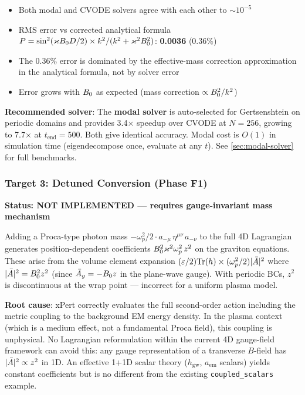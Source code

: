 \begin{itemize}
  \item Both modal and CVODE solvers agree with each other to $\sim 10^{-5}$
  \item RMS error vs corrected analytical formula $P = \sin^2(\varkappa B_0 D/2) \times k^2/(k^2 + \varkappa^2B_0^2)$: \textbf{0.0036} (0.36\%)
  \item The 0.36\% error is dominated by the effective-mass correction approximation in the analytical formula, not by solver error
  \item Error grows with $B_0$ as expected (mass correction $\propto B_0^2/k^2$)
\end{itemize}

\textbf{Recommended solver}: The \textbf{modal solver} is auto-selected for Gertsenshtein on periodic domains and provides 3.4$\times$ speedup over CVODE at $N = 256$, growing to 7.7$\times$ at $t_\mathrm{end} = 500$. Both give identical accuracy. Modal cost is $O(1)$ in simulation time (eigendecompose once, evaluate at any $t$). See \cref{sec:modal-solver} for full benchmarks.

\subsubsection{Target 3: Detuned Conversion (Phase F1)}
\label{subsec:target3}

\textbf{Status: NOT IMPLEMENTED --- requires gauge-invariant mass mechanism}

Adding a Proca-type photon mass $-\omega_p^2/2 \cdot a_{-\mu}\, \eta^{\mu\nu}\, a_{-\nu}$ to the full 4D Lagrangian generates position-dependent coefficients $B_0^2\varkappa^2\omega_p^2\, z^2$ on the graviton equations. These arise from the volume element expansion $(\varepsilon/2)\mathrm{Tr}(h) \times (\omega_p^2/2)|\bar{A}|^2$ where $|\bar{A}|^2 = B_0^2 z^2$ (since $\bar{A}_y = -B_0 z$ in the plane-wave gauge). With periodic BCs, $z^2$ is discontinuous at the wrap point --- incorrect for a uniform plasma model.

\textbf{Root cause}: xPert correctly evaluates the full second-order action including the metric coupling to the background EM energy density. In the plasma context (which is a medium effect, not a fundamental Proca field), this coupling is unphysical. No Lagrangian reformulation within the current 4D gauge-field framework can avoid this: any gauge representation of a transverse $B$-field has $|\bar{A}|^2 \propto z^2$ in 1D. An effective 1+1D scalar theory ($h_\mathrm{gw}$, $a_\mathrm{em}$ scalars) yields constant coefficients but is no different from the existing \texttt{coupled\_scalars} example.

